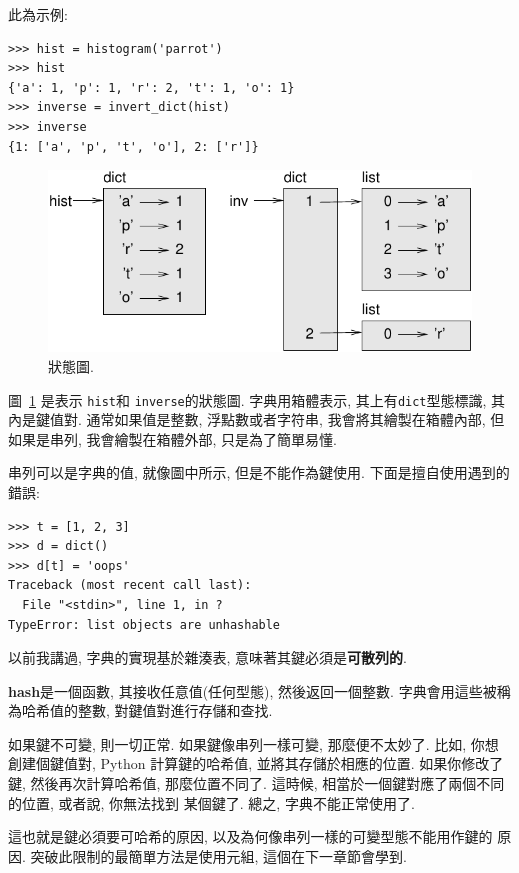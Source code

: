 \documentclass[10pt]{book}
\begin{document}
此為示例:

\begin{verbatim}
>>> hist = histogram('parrot')
>>> hist
{'a': 1, 'p': 1, 'r': 2, 't': 1, 'o': 1}
>>> inverse = invert_dict(hist)
>>> inverse
{1: ['a', 'p', 't', 'o'], 2: ['r']}
\end{verbatim}

\begin{figure}
\centerline
{\includegraphics[scale=0.8]{figs/dict1.pdf}}
\caption{狀態圖.}
\label{fig.dict1}
\end{figure}

圖~\ref{fig.dict1} 是表示 {\tt hist}和 {\tt inverse}的狀態圖. 
字典用箱體表示, 其上有{\tt dict}型態標識, 其內是鍵值對. 
通常如果值是整數, 浮點數或者字符串, 我會將其繪製在箱體內部, 
但如果是串列, 我會繪製在箱體外部, 只是為了簡單易懂. 

串列可以是字典的值, 就像圖中所示, 但是不能作為鍵使用. 
下面是擅自使用遇到的錯誤:


\begin{verbatim}
>>> t = [1, 2, 3]
>>> d = dict()
>>> d[t] = 'oops'
Traceback (most recent call last):
  File "<stdin>", line 1, in ?
TypeError: list objects are unhashable
\end{verbatim}
%
以前我講過, 字典的實現基於雜湊表, 意味著其鍵必須是{\bf 可散列的}.

{\bf hash}是一個函數, 其接收任意值(任何型態), 然後返回一個整數. 
字典會用這些被稱為哈希值的整數, 對鍵值對進行存儲和查找. 

如果鍵不可變, 則一切正常. 
如果鍵像串列一樣可變, 那麼便不太妙了. 
比如, 你想創建個鍵值對, 
Python 計算鍵的哈希值, 並將其存儲於相應的位置. 
如果你修改了鍵, 然後再次計算哈希值, 那麼位置不同了. 
這時候, 相當於一個鍵對應了兩個不同的位置, 或者說, 你無法找到
某個鍵了. 總之, 字典不能正常使用了. 

這也就是鍵必須要可哈希的原因, 以及為何像串列一樣的可變型態不能用作鍵的
原因. 突破此限制的最簡單方法是使用元組, 這個在下一章節會學到. 
\end{document}
